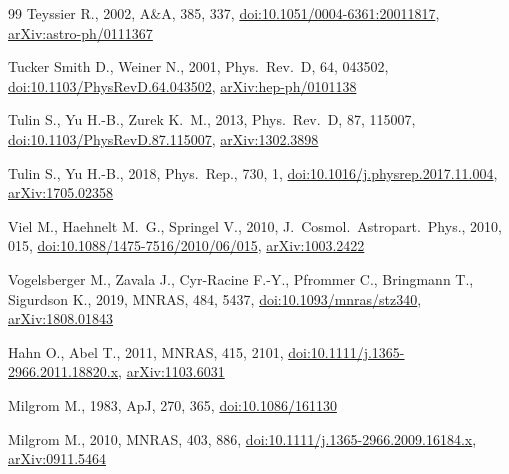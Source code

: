 \documentclass[fleqn,usenatbib]{mnras}
\begin{document}
\begin{thebibliography}{99}
Teyssier R., 2002, A\&A, 385, 337,
\href{https://doi.org/10.1051/0004-6361:20011817}{doi:10.1051/0004-6361:20011817},
\href{https://arxiv.org/abs/astro-ph/0111367}{arXiv:astro-ph/0111367}

Tucker Smith D., Weiner N., 2001, Phys.\ Rev.\ D, 64, 043502,
\href{https://doi.org/10.1103/PhysRevD.64.043502}{doi:10.1103/PhysRevD.64.043502},
\href{https://arxiv.org/abs/hep-ph/0101138}{arXiv:hep-ph/0101138}

Tulin S., Yu H.-B., Zurek K.~M., 2013, Phys.\ Rev.\ D, 87, 115007,
\href{https://doi.org/10.1103/PhysRevD.87.115007}{doi:10.1103/PhysRevD.87.115007},
\href{https://arxiv.org/abs/1302.3898}{arXiv:1302.3898}

Tulin S., Yu H.-B., 2018, Phys.\ Rep., 730, 1,
\href{https://doi.org/10.1016/j.physrep.2017.11.004}{doi:10.1016/j.physrep.2017.11.004},
\href{https://arxiv.org/abs/1705.02358}{arXiv:1705.02358}

Viel M., Haehnelt M.~G., Springel V., 2010, J.\ Cosmol.\ Astropart.\ Phys., 2010, 015,
\href{https://doi.org/10.1088/1475-7516/2010/06/015}{doi:10.1088/1475-7516/2010/06/015},
\href{https://arxiv.org/abs/1003.2422}{arXiv:1003.2422}

Vogelsberger M., Zavala J., Cyr-Racine F.-Y., Pfrommer C., Bringmann T., Sigurdson K., 2019, MNRAS, 484, 5437,
\href{https://doi.org/10.1093/mnras/stz340}{doi:10.1093/mnras/stz340},
\href{https://arxiv.org/abs/1808.01843}{arXiv:1808.01843}

Hahn O., Abel T., 2011, MNRAS, 415, 2101,
\href{https://doi.org/10.1111/j.1365-2966.2011.18820.x}{doi:10.1111/j.1365-2966.2011.18820.x},
\href{https://arxiv.org/abs/1103.6031}{arXiv:1103.6031}

Milgrom M., 1983, ApJ, 270, 365,
\href{https://doi.org/10.1086/161130}{doi:10.1086/161130}

Milgrom M., 2010, MNRAS, 403, 886,
\href{https://doi.org/10.1111/j.1365-2966.2009.16184.x}{doi:10.1111/j.1365-2966.2009.16184.x},
\href{https://arxiv.org/abs/0911.5464}{arXiv:0911.5464}


\end{thebibliography}
\end{document}
